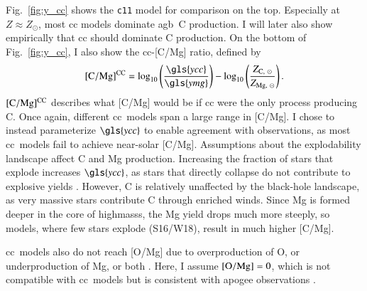 \documentclass[12pt,oneside,letterpaper]{report}
\newcommand{\cc}{\gls{cc}}
\newcommand{\Cc}{\Gls{cc}}
\newcommand{\agb}{\gls{agb}}
\newcommand{\apogee}{\gls{apogee}}
\newcommand{\cxi}{\texttt{\gls{c11}}}
\newcommand{\Ycc}{\gls{ycc}}
\newcommand{\Yoc}{\gls{ymg}}
\newcommand{\sun}{\odot}
\begin{document}
Fig.~\ref{fig:y_cc} shows the \cxi{} model for comparison on the top. Especially at $Z\approx Z_\odot$, most \cc{} models dominate \agb\ C production. I will later also show empirically that \cc{} should dominate C production. 
On the bottom of Fig.~\ref{fig:y_cc}, I also show the \cc{}-[C/Mg] ratio, defined by
\begin{equation}\label{eq:c_mg_cc}
    {\rm [C/Mg]^{CC}} = \log_{10}\left( \frac{\Ycc}{\Yoc}\right) - \log_{10} \left( \frac{Z_{{\rm C},\ \sun }}{Z_{{\rm Mg},\ \sun }} \right).
\end{equation}
${\rm [C/Mg]^{CC}}$ describes what [C/Mg] would be if \cc{} were the only process producing C.
Once again, different \cc\ models span a large range in [C/Mg]. 
I chose to instead parameterize $\Ycc$ to enable agreement with observations, as most \cc\ models fail to achieve near-solar [C/Mg].
Assumptions about the explodability landscape affect C and Mg production. Increasing the fraction of stars that explode increases $\Ycc$, as stars that directly collapse do not contribute to explosive yields \citep{emily+21}. However, C is relatively unaffected by the black-hole landscape, as very massive stars contribute C through enriched winds. Since Mg is formed deeper in the core of \gls{highmass}s, the Mg yield drops much more steeply, so models, where few stars explode (S16/W18), result in much higher [C/Mg].

\Cc\ models also do not reach [O/Mg] due to overproduction of O, or underproduction of Mg, or both \citep{emily+21}. Here, I assume ${\rm [O/Mg]} = 0$, which is not compatible with \cc\ models but is consistent with \apogee{} observations \citep{weinberg+19, weinberg+22}.
    
\end{document}
